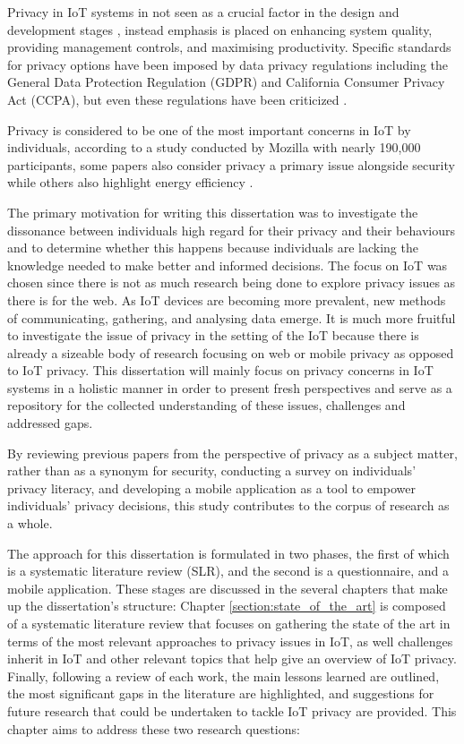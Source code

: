 Privacy in IoT systems in not seen as a crucial factor in the design and
development stages \cite{alhirabi2021security}, instead emphasis is placed
on enhancing system quality, providing management controls, and maximising productivity.
Specific standards for privacy options have been imposed by data privacy
regulations including the General Data Protection Regulation (GDPR) and
California Consumer Privacy Act (CCPA), but even these regulations have
been criticized \cite{peloquin2020disruptive, gladis2022weaponizing, gentile2022deficient, green2022flaws, byun2019privacy}.

Privacy is considered to be one of the most important concerns in IoT by
individuals, according to a study conducted by Mozilla \cite{Jen2017ten}
with nearly 190,000 participants, some papers \cite{khan2021issues, MOHAMMADZADEH2018124}
also consider privacy a primary issue alongside security while others also highlight
energy efficiency \cite{sisinni2018industrial}.

The primary motivation for writing this dissertation was to investigate
the dissonance between individuals high regard for their privacy
and their behaviours and to determine whether this happens because individuals
are lacking the knowledge needed to make better and informed decisions.
The focus on IoT was chosen since there is not as much research being done to
explore privacy issues as there is for the web. As IoT devices are becoming
more prevalent, new methods of communicating,
gathering, and analysing data emerge.
It is much more fruitful to investigate the issue of privacy in the setting
of the IoT because there is already a sizeable body of research focusing on
web or mobile privacy as opposed to IoT privacy. This dissertation will mainly
focus on privacy concerns in IoT systems in a holistic manner in order to present
fresh perspectives and serve as a repository for the collected understanding of
these issues, challenges and addressed gaps.

By reviewing previous papers from the perspective of privacy as a subject matter,
rather than as a synonym for security, conducting a survey on individuals' privacy literacy,
and developing a mobile application as a tool to empower individuals' privacy decisions,
this study contributes to the corpus of research as a whole.

The approach for this dissertation is formulated in two phases, the first of
which is a systematic literature review (SLR), and the second is a questionnaire, and
a mobile application. These stages are discussed
in the several chapters that make up the dissertation's structure: Chapter \ref{section:state_of_the_art}
is composed of a systematic literature review that focuses on gathering the state
of the art in terms of the most relevant approaches to privacy issues in IoT, as
well challenges inherit in IoT and other relevant topics that help give an
overview of IoT privacy. Finally, following a review of each work, the main lessons
learned are outlined, the most significant gaps in the literature are highlighted,
and suggestions for future research that could be undertaken to tackle IoT privacy
are provided. This chapter aims to address these two research questions:\\

